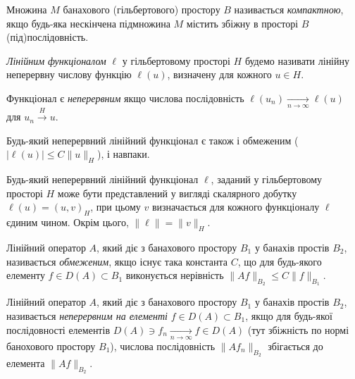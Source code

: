 \begin{definition}
    Множина $M$ банахового (гільбертового) простору $B$ називається \emph{компактною}, якщо будь-яка нескінчена підмножина $M$ містить збіжну в просторі $B$ (під)послідовність.
\end{definition}

\begin{definition}
    \emph{Лінійним функціоналом} $\ell$ у гільбертовому просторі $H$ будемо називати лінійну неперервну числову функцію $\ell(u)$, визначену для кожного $u \in H$.
\end{definition}

\begin{definition}
    Функціонал є \emph{неперервним} якщо числова послідовність $\ell(u_n) \xrightarrow[n \to \infty]{} \ell(u)$ для $u_n \xrightarrow{H} u$.
\end{definition}

\begin{proposition}
    Будь-який неперервний лінійний функціонал є також і обмеженим ($|\ell(u)| \le C \|u\|_H$), і навпаки.
\end{proposition}

\begin{theorem}
    Будь-який неперервний лінійний функціонал $\ell$, заданий у гільбертовому просторі $H$ може бути представлений у вигляді скалярного добутку $\ell(u) = (u,v)_H$, при цьому $v$ визначається для кожного функціоналу $\ell$ єдиним чином. Окрім цього, $\|\ell\| = \|v\|_H$.
\end{theorem}

\begin{definition}
    Лінійний оператор $A$, який діє з банахового простору $B_1$ у банахів простів $B_2$, називається \emph{обмеженим}, якщо існує така константа $C$, що для будь-якого елементу $f \in D(A) \subset B_1$ виконується нерівність $\|A f\|_{B_2} \le C \|f\|_{B_1}$.
\end{definition}

\begin{definition}
    Лінійний оператор $A$, який діє з банахового простору $B_1$ у банахів простів $B_2$, називається \emph{неперервним на елементі} $f \in D(A) \subset B_1$, якщо для будь-якої послідовності елементів $D(A) \ni f_n \xrightarrow[n \to \infty]{} f \in D(A)$ (тут збіжність по нормі банохового простору $B_1$), числова послідовність $\|Af_n\|_{B_2}$ збігається до елемента $\|Af\|_{B_2}$.
\end{definition}

